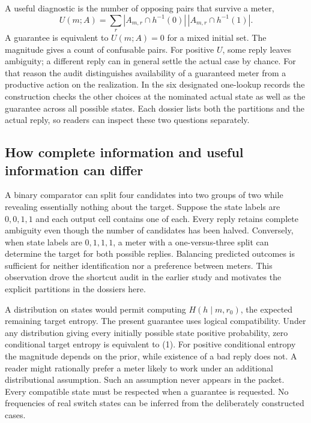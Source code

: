 \documentclass[12pt,letterpaper]{article}
\begin{document}
A useful diagnostic is the number of opposing pairs that survive a meter,
\[
              U(m;A)=\sum_{r}|A_{m,r}\cap h^{-1}(0)|\,
                                  |A_{m,r}\cap h^{-1}(1)|.
              \tag{2}
\]
A guarantee is equivalent to $U(m;A)=0$ for a mixed initial set. The magnitude gives a count of confusable pairs. For positive $U$, some reply leaves ambiguity; a different reply can in general settle the actual case by chance. For that reason the audit distinguishes availability of a guaranteed meter from a productive action on the realization. In the six designated one-lookup records the construction checks the other choices at the nominated actual state as well as the guarantee across all possible states. Each dossier lists both the partitions and the actual reply, so readers can inspect these two questions separately.

\subsection{How complete information and useful information can differ}

A binary comparator can split four candidates into two groups of two while revealing essentially nothing about the target. Suppose the state labels are $0,0,1,1$ and each output cell contains one of each. Every reply retains complete ambiguity even though the number of candidates has been halved. Conversely, when state labels are $0,1,1,1$, a meter with a one-versus-three split can determine the target for both possible replies. Balancing predicted outcomes is sufficient for neither identification nor a preference between meters. This observation drove the shortcut audit in the earlier study and motivates the explicit partitions in the dossiers here.

A distribution on states would permit computing $H(h\mid m,r_0)$, the expected remaining target entropy. The present guarantee uses logical compatibility. Under any distribution giving every initially possible state positive probability, zero conditional target entropy is equivalent to (1). For positive conditional entropy the magnitude depends on the prior, while existence of a bad reply does not. A reader might rationally prefer a meter likely to work under an additional distributional assumption. Such an assumption never appears in the packet. Every compatible state must be respected when a guarantee is requested. No frequencies of real switch states can be inferred from the deliberately constructed cases.
\end{document}
